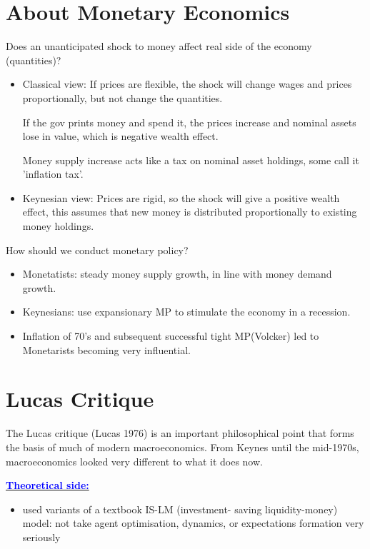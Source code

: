 \section{About Monetary Economics}

Does an unanticipated shock to money affect real side of the
economy (quantities)?

\begin{itemize}
    \item Classical view: If prices are flexible, the shock
    will change wages and prices proportionally, but not change the quantities.

    If the gov prints money and spend it, the prices increase and nominal assets lose in value, 
    which is negative wealth effect.

    Money supply increase acts like a tax on nominal asset 
    holdings, some call it 'inflation tax'.

    \item Keynesian view: Prices are rigid, so the shock will
    give a positive wealth effect, this assumes that new money is distributed proportionally to existing money holdings.
\end{itemize}

How should we conduct monetary policy?

\begin{itemize}
    \item Monetatists: steady money supply growth, in line with money
    demand growth.
    \item Keynesians: use expansionary MP to stimulate the economy
    in a recession.
    \item Inﬂation of 70's and subsequent successful tight MP(Volcker)
    led to Monetarists becoming very inﬂuential.
\end{itemize}

\section{Lucas Critique}

The Lucas critique (Lucas 1976\cite{lucas1976econometric}) is an important philosophical point that forms the basis of much
of modern macroeconomics.
From Keynes until the mid-1970s, macroeconomics looked very different
to what it does now.

\underline{\textcolor{blue}{\textbf{Theoretical side:}}}
\begin{itemize}
    \item used variants of a textbook IS-LM (investment-
    saving liquidity-money) model: not take agent optimisation, dynamics, or expectations
    formation very seriously
\end{itemize}

